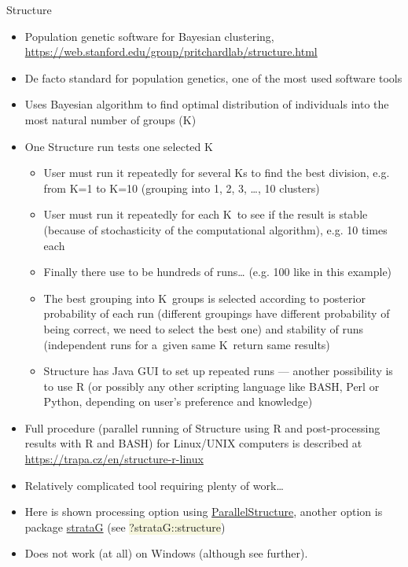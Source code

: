 \documentclass[compress, ucs, xelatex, 11pt, xcolor=svgnames, aspectratio=169,
	hyperref={
		bookmarks=true,
		unicode=true,
		colorlinks=true,
		pdftitle={Molecular data in R},
		plainpages=false,
		pdfauthor={Vojtech Zeisek},
		pdfsubject={Course about phylogeny and evolution in R},
		pdfcreator={XeLaTeX},
		pdfkeywords={R, evolution, phylogeny, molecular data},
		linkcolor=Crimson, %
		anchorcolor=Magenta, %
		citecolor=Magenta, %
		filecolor=Magenta, %
		menucolor=Magenta, %
		urlcolor=DodgerBlue, %
		pdftex},
	url={hyphens, lowtilde} %
	]{beamer}
\renewcommand{\texttt}[1]{\colorbox{Beige}{{\ttfamily #1}}}
\begin{document}
\begin{frame}[allowframebreaks]{Structure}
	\label{structure}
	\begin{itemize}
		\item Population genetic software for Bayesian clustering, \url{https://web.stanford.edu/group/pritchardlab/structure.html}
		\item De facto standard for population genetics, one of the most used software tools
		\item Uses Bayesian algorithm to find optimal distribution of individuals into the most natural number of groups (K)
		\item One Structure run tests one selected K
		\begin{itemize}
			\item User must run it repeatedly for several Ks to find the best division, e.g. from K=1 to K=10 (grouping into 1, 2, 3, \ldots, 10 clusters)
			\item User must run it repeatedly for each K~to see if the result is stable (because of stochasticity of the computational algorithm), e.g. 10 times each
			\item Finally there use to be hundreds of runs\ldots{ } (e.g. 100 like in this example)
			\item The best grouping into K~groups is selected according to posterior probability of each run (different groupings have different probability of being correct, we need to select the best one) and stability of runs (independent runs for a~given same K~return same results)
			\item Structure has Java GUI to set up repeated runs --- another possibility is to use R (or possibly any other scripting language like BASH, Perl or Python, depending on user's preference and knowledge)
		\end{itemize}
		\item Full procedure (parallel running of Structure using R and post-processing results with R and BASH) for Linux/UNIX computers is described at \url{https://trapa.cz/en/structure-r-linux}
		\item Relatively complicated tool requiring plenty of work\ldots
		\item Here is shown processing option using \href{https://r-forge.r-project.org/R/?group_id=1636}{ParallelStructure}, another option is package \href{https://CRAN.R-project.org/package=strataG}{strataG} (see \texttt{?strataG::structure})
		\item \alert{Does not work (at all) on Windows} (although see further).
	\end{itemize}
\end{frame}
\end{document}
